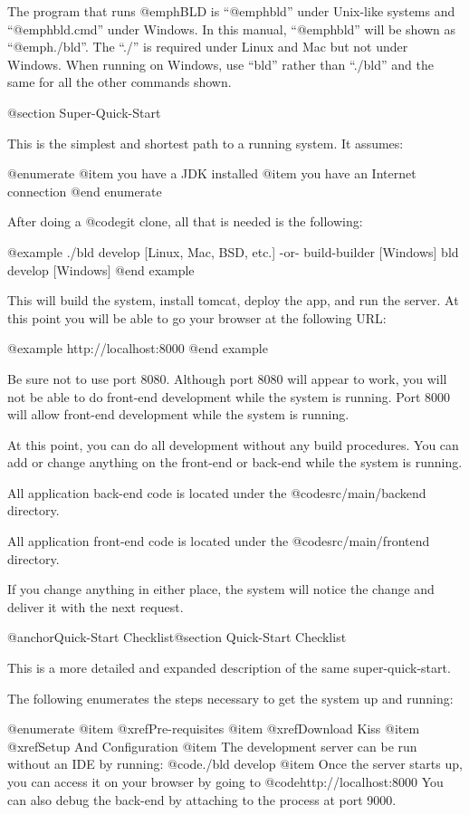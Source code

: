 The program that runs @emph{BLD} is ``@emph{bld}'' under Unix-like
systems and ``@emph{bld.cmd}'' under Windows.  In this manual,
``@emph{bld}'' will be shown as ``@emph{./bld}''.  The ``./'' is
required under Linux and Mac but not under Windows.  When running on
Windows, use ``bld'' rather than ``./bld'' and the same for all the
other commands shown.

@section Super-Quick-Start

This is the simplest and shortest path to a running system.  It assumes:

@enumerate
@item
you have a JDK installed
@item
you have an Internet connection
@end enumerate

After doing a @code{git clone}, all that is needed is the following:

@example
    ./bld  develop                      [Linux, Mac, BSD, etc.]
         -or-
    build-builder                       [Windows]
    bld  develop                        [Windows]
@end example

This will build the system, install tomcat, deploy the app, and run
the server.  At this point you will be able to go your browser at the
following URL:

@example
    http://localhost:8000
@end example

Be sure not to use port 8080.  Although port 8080 will appear to work,
you will not be able to do front-end development while the system is
running.  Port 8000 will allow front-end development while the system
is running.

At this point, you can do all development without any build
procedures.  You can add or change anything on the front-end or
back-end while the system is running.

All application back-end code is located under the @code{src/main/backend}
directory.

All application front-end code is located under the @code{src/main/frontend}
directory.

If you change anything in either place, the system will notice the change 
and deliver it with the next request.


@anchor{Quick-Start Checklist}@section Quick-Start Checklist

This is a more detailed and expanded description of the same
super-quick-start.

The following enumerates the steps necessary to get the system up and running:

@enumerate
@item
@xref{Pre-requisites}
@item
@xref{Download Kiss}
@item
@xref{Setup And Configuration}
@item
The development server can be run without an IDE by running: @code{./bld develop}
@item
Once the server starts up, you can access it on your browser by going to 
@code{http://localhost:8000}  You can also debug the back-end by
attaching to the process at port 9000.

